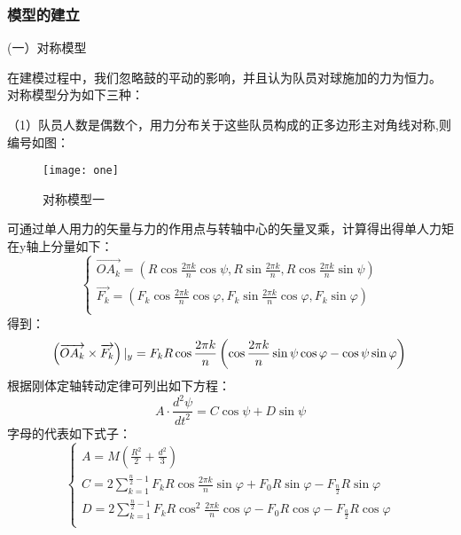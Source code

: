 \documentclass[withoutpreface,bwprint]{cumcmthesis} %
\begin{document}
	\subsubsection{模型的建立}
(一）对称模型 \par
在建模过程中，我们忽略鼓的平动的影响，并且认为队员对球施加的力为恒力。
对称模型分为如下三种：\par
（1）队员人数是偶数个，用力分布关于这些队员构成的正多边形主对角线对称,则编号如图：
\begin{figure}[!hbtp]
    \centering
    \texttt{[image: one]}
    \caption{对称模型一}

    \label{fig:one}
\end{figure}\par
可通过单人用力的矢量与力的作用点与转轴中心的矢量叉乘，计算得出得单人力矩在y轴上分量如下：
\begin{equation}
\begin{cases}
    
\overrightarrow{OA_k}=\left ( R\cos\frac{2\pi k}{n}\cos \psi ,R\sin\frac{2\pi k}{n},R \cos\frac{2\pi k}{n}\sin\psi \right ) \\


\overrightarrow{F_k}=\left ( F_k\cos\frac{2\pi k}{n}\cos\varphi ,F_k\sin\frac{2\pi k}{n}\cos\varphi ,F_k\sin\varphi  \right ) \\

\end{cases}
\end{equation}
得到：
\begin{equation}
\left ( \overrightarrow{OA_k} \times \overrightarrow{F_k}\right )|_y=F_kR\cos\frac{2\pi k}{n}\left ( \cos\frac{2\pi k}{n}\sin\psi\cos\varphi -\cos\psi\sin\varphi  \right ) \\
\end{equation}
根据刚体定轴转动定律可列出如下方程：
\begin{equation}
A\cdot \frac{d^{2}\psi }{dt^{2} }=C\cos\psi+D\sin \psi
\end{equation}
字母的代表如下式子：
\begin{equation}
\begin{cases}
A=M\left ( \frac{R^2}{2}+\frac{d^2}{3} \right ) \\
C=2\sum_{k=1}^{\frac{n}{2}-1}F_kR\cos\frac{2\pi k}{n}\sin\varphi + F_0 R\sin\varphi- F_\frac{n}{2} R\sin\varphi
 \\ 
D=2\sum_{k=1}^{\frac{n}{2}-1}F_kR\cos^2\frac{2\pi k}{n}\cos\varphi-F_0R\cos\varphi-F_\frac{a}{2}R\cos\varphi 
\\
\end{cases}
\end{equation}
\end{document}
